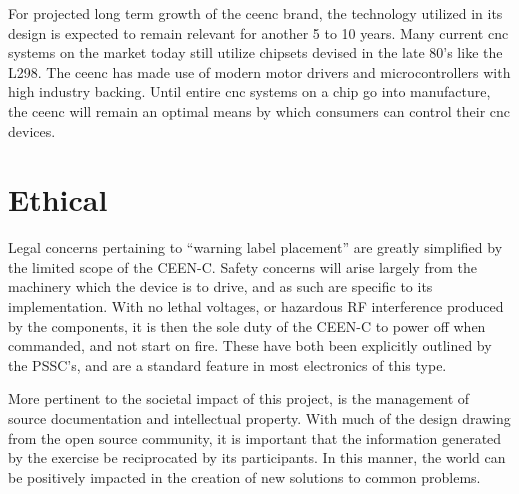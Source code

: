 For projected long term growth of the \gls{ceenc} brand, the technology utilized in its design is expected to remain relevant for another 5 to 10 years.
Many current \gls{cnc} systems on the market today still utilize chipsets devised in the late 80's like the L298. 
The \gls{ceenc} has made use of modern motor drivers and microcontrollers with high industry backing.
Until entire \gls{cnc} systems on a chip go into manufacture, the \gls{ceenc} will remain an optimal means by which consumers can control their \gls{cnc} devices.
 
\section{Ethical}
Legal concerns pertaining to “warning label placement” are greatly simplified by the limited scope of the CEEN-C. 
Safety concerns will arise largely from the machinery which the device is to drive, and as such are specific to its implementation. 
With no lethal voltages, or hazardous RF interference produced by the components, it is then the sole duty of the CEEN-C to power off when commanded, and not start on fire. 
These have both been explicitly outlined by the PSSC’s, and are a standard feature in most electronics of this type.

More pertinent to the societal impact of this project, is the management of source documentation and intellectual property. 
With much of the design drawing from the open source community, it is important that the information generated by the exercise be reciprocated by its participants. 
In this manner, the world can be positively impacted in the creation of new solutions to common problems. 

